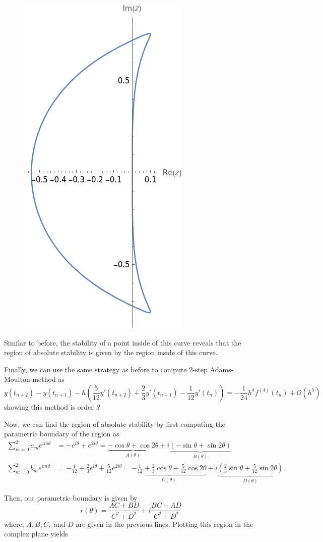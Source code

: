 \documentclass[a4paper,12pt]{article}
\newcommand{\bigO}{\mathcal{O}}
\begin{document}
\begin{enumerate}[label = (\arabic*)]
	\begin{figure}[h]
		\centering
		\includegraphics[width = 0.3 \textwidth]{Images/AB3.png}
	\end{figure}

	Similar to before, the stability of a point inside of this curve reveals that the region of absolute stability is given by the region inside of this curve.
	
	\newpage
	Finally, we can use the same strategy as before to compute 2-step Adams-Moulton method as
	\[
		y(t_{n +2}) - y(t_{n + 1}) - h \left( \frac{5}{12} y'(t_{n + 2}) + \frac{2}{3} y'(t_{n + 1}) - \frac{1}{12} y'(t_n) \right) = -\frac{1}{24} h^4 f^{(4)}(t_n) + \bigO(h^5)
	\]
	showing this method is order \emph{3}
	
	Now, we can find the region of absolute stability by first computing the parametric boundary of the region as
	\begin{align*}
		\sum_{m = 0}^{2} a_m e^{i m \theta} &= -e^{i \theta} + e^{2 i \theta} = \underbrace{-\cos\theta +\cos 2\theta}_{A(\theta)} + i \underbrace{(-\sin \theta + \sin 2\theta)}_{B(\theta)} \\
		\sum_{m = 0}^{2} b_m e^{i m \theta} &= -\frac{1}{12} + \frac{2}{3} e^{i \theta} + \frac{5}{12} e^{2i \theta} = \underbrace{-\frac{1}{12} + \frac{2}{3}\cos\theta + \frac{5}{12} \cos 2\theta}_{C(\theta)} + i \underbrace{\left(\frac{2}{3}\sin\theta + \frac{5}{12} \sin 2\theta\right)}_{D(\theta)}.
	\end{align*}
	
	Then, our parametric boundary is given by 
	\[
	r(\theta) = \frac{AC + BD}{C^2 + D^2} + i \frac{BC - AD}{C^2 + D^2}
	\]
	where, $ A, B, C, $ and $ D $ are given in the previous lines. Plotting this region in the complex plane yields
	

\end{enumerate}
\end{document}
